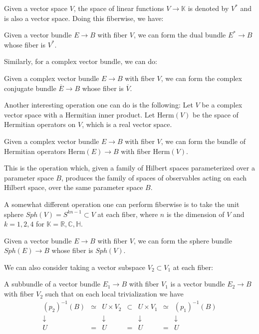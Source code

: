 \documentclass[12pt]{article}
\numberwithin{equation}{section}
\numberwithin{figure}{section}
\theoremstyle{remark}
\def\bC{\mathbb{C}}
\def\bH{\mathbb{H}}
\def\bK{\mathbb{K}}
\def\bR{\mathbb{R}}
\let\bar\overline
\begin{document}
Given a vector space $V$, the space of linear functions $V\to \bK$ is denoted by $V^*$
and is also a  vector space.
Doing this fiberwise, we have:
\begin{definition}
  Given a vector bundle $E\to B$ with fiber $V$,
  we can form the dual bundle $E^*\to B$ whose fiber is $V^*$.
\end{definition}
Similarly, for a complex vector bundle, we can do:
\begin{definition}
  Given a complex vector bundle $E\to B$ with fiber $V$,
  we can form the complex conjugate bundle $\bar E\to B$ whose fiber is $\bar V$.
\end{definition}


Another interesting operation one can do is the following:
Let $V$ be a complex vector space with a Hermitian inner product.
Let $\mathrm{Herm}(V)$ be the space of Hermitian operators on $V$,
which is a real vector space.
\begin{definition}
  Given a complex vector bundle $E\to B$ with fiber $V$,
  we can form the bundle of Hermitian operators $\mathrm{Herm}(E)\to B$ with fiber $\mathrm{Herm}(V)$.
\end{definition}
This is the operation which, given a family of Hilbert spaces parameterized over 
a parameter space $B$,
produces the family of spaces of observables acting on each Hilbert space, over the same parameter space $B$.

A somewhat different operation one can perform fiberwise 
is to take the unit sphere $Sph(V)=S^{kn-1} \subset V$ at each fiber, where $n$ is the dimension of $V$
and $k=1,2,4$ for $\bK=\bR,\bC,\bH$.
\begin{definition}
  Given a vector bundle $E\to B$ with fiber $V$,
  we can form the sphere bundle $Sph(E)\to B$ whose fiber is $Sph(V)$.
\end{definition}

We can also consider taking a vector subspace $V_2\subset V_1$ at each fiber:
\begin{definition}
A subbundle of a vector bundle $E_1\to B$ with fiber $V_1$ is 
a vector bundle $E_2\to B$ with fiber $V_2$ such that on each local trivialization 
we have 
\begin{equation}
  \begin{array}{cccccccc}
    (p_2)^{-1}(B) &\simeq & U\times V_2 & \subset  & U\times V_1 &\simeq & (p_1)^{-1}(B) \\ 
    \downarrow & & \downarrow & & \downarrow & & \downarrow \\
    U & = & U & = & U & = & U
  \end{array}
  \end{equation}
\end{definition}
\end{document}
